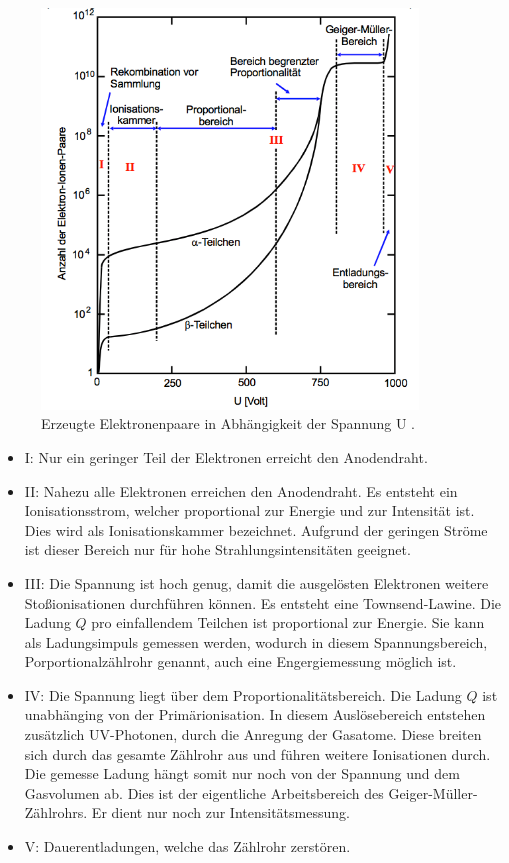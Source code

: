 \begin{figure}
  \centering
  \includegraphics[width=10cm]{bilder/bereiche.png}
  \caption{Erzeugte Elektronenpaare in Abhängigkeit der Spannung U \cite{703}.}
  \label{fig:bereiche}
\end{figure}
\begin{itemize}
  \item{I: Nur ein geringer Teil der Elektronen erreicht den Anodendraht.} \\
  \item{II: Nahezu alle Elektronen erreichen den Anodendraht. Es entsteht ein
  Ionisationsstrom, welcher proportional zur Energie und zur Intensität ist. Dies
  wird als Ionisationskammer bezeichnet. Aufgrund der geringen Ströme ist dieser Bereich
  nur für hohe Strahlungsintensitäten geeignet.} \\
  \item{III: Die Spannung ist hoch genug, damit die ausgelösten Elektronen weitere
  Stoßionisationen durchführen können. Es entsteht eine Townsend-Lawine. Die Ladung $Q$
  pro einfallendem Teilchen
  ist proportional zur Energie. Sie kann als Ladungsimpuls gemessen werden, wodurch
  in diesem Spannungsbereich, Porportionalzählrohr genannt, auch eine Engergiemessung
  möglich ist.} \\
  \item{IV: Die Spannung liegt über dem Proportionalitätsbereich. Die Ladung $Q$ ist
  unabhänging von der Primärionisation. In diesem Auslösebereich entstehen zusätzlich
  UV-Photonen, durch die Anregung der Gasatome. Diese breiten sich durch das gesamte
  Zählrohr aus und führen weitere Ionisationen durch. Die gemesse Ladung hängt somit
  nur noch von der Spannung und dem Gasvolumen ab. Dies ist der eigentliche Arbeitsbereich
  des Geiger-Müller-Zählrohrs. Er dient nur noch zur Intensitätsmessung.} \\
  \item{V: Dauerentladungen, welche das Zählrohr zerstören.}
\end{itemize}

